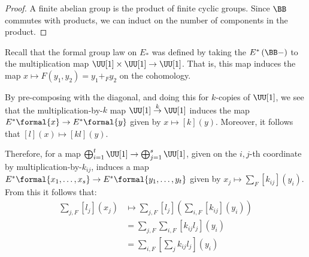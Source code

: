 \begin{proof}
	A finite abelian group is the product of finite cyclic groups.
	Since $\BB$ commutes with products, we can induct on the number of components in the product.
\end{proof}


Recall that the formal group law on $E_*$ was defined by taking the $E^*\left(\BB-\right)$ to the multiplication map $\UU[1] \times \UU[1] \to \UU[1]$.
That is, this map induces the map $x \mapsto F\left(y_1, y_2\right) = y_1 +_F y_2$ on the cohomology.

By pre-composing with the diagonal, and doing this for $k$-copies of $\UU[1]$, we see that the multiplication-by-$k$ map $\UU[1] \overset{k}{\to} \UU[1]$ induces the map $E^*\formal{x} \to E^*\formal{y}$ given by $x \mapsto \left[k\right]\left(y\right)$.
Moreover, it follows that $\left[l\right]\left(x\right) \mapsto \left[kl\right]\left(y\right)$.

Therefore, for a map $\bigoplus_{i=1}^t \UU[1] \to \bigoplus_{j=1}^s \UU[1]$, given on the $i,j$-th coordinate by multiplication-by-$k_{ij}$, induces a map
$E^*\formal{x_1, \dotsc, x_s} \to E^*\formal{y_1, \dotsc, y_t}$
given by $x_j \mapsto \sum_F\left[k_{ij}\right]\left(y_i\right)$.
From this it follows that:
\begin{align*}
	\sum_{j,F}\left[l_j\right]\left(x_j\right)
	&\mapsto \sum_{j,F}\left[l_j\right]\left(\sum_{i,F}\left[k_{ij}\right]\left(y_i\right)\right)\\
	&= \sum_{j,F}\sum_{i,F}\left[k_{ij} l_j\right]\left(y_i\right)\\
	&= \sum_{i,F}\left[\sum_j k_{ij} l_j\right]\left(y_i\right)
\end{align*}

